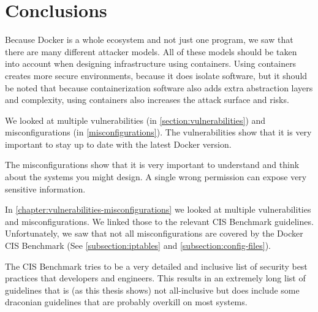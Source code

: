\chapter{Conclusions}
Because Docker is a whole ecosystem and not just one program, we saw that there are many different attacker models. All of these models should be taken into account when designing infrastructure using containers. Using containers creates more secure environments, because it does isolate software, but it should be noted that because containerization software also adds extra abstraction layers and complexity, using containers also increases the attack surface and risks.

\hfill

We looked at multiple vulnerabilities (in \autoref{section:vulnerabilities}) and misconfigurations (in \autoref{misconfigurations}). The vulnerabilities show that it is very important to stay up to date with the latest Docker version.

The misconfigurations show that it is very important to understand and think about the systems you might design. A single wrong permission can expose very sensitive information.

\hfill

In \autoref{chapter:vulnerabilities-misconfigurations} we looked at multiple vulnerabilities and misconfigurations. We linked those to the relevant CIS Benchmark guidelines. Unfortunately, we saw that not all misconfigurations are covered by the Docker CIS Benchmark (See \autoref{subsection:iptables} and \autoref{subsection:config-files}).

The CIS Benchmark tries to be a very detailed and inclusive list of security best practices that developers and engineers. This results in an extremely long list of guidelines that is (as this thesis shows) not all-inclusive but does include some draconian guidelines that are probably overkill on most systems.
